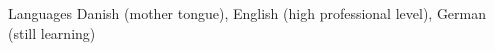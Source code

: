 


\begin{cvskills}


\cvskill
{Languages} %
{Danish (mother tongue), English (high professional level), German (still learning)} %


\end{cvskills}
